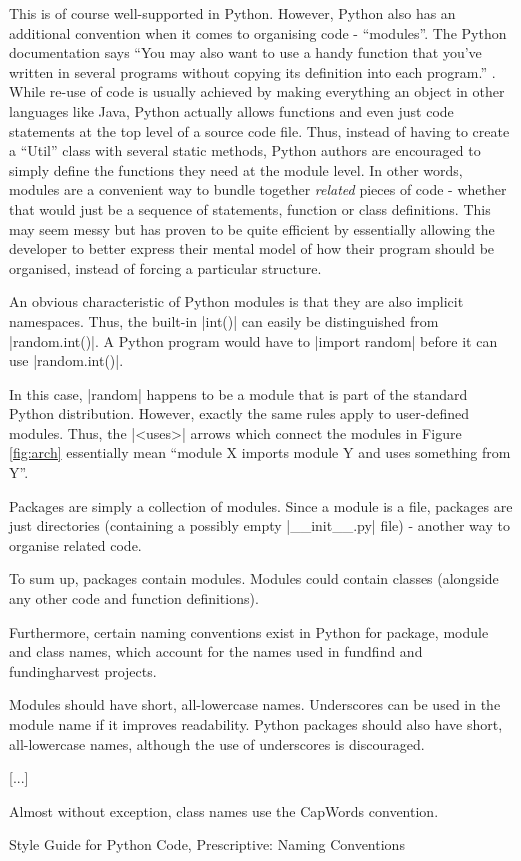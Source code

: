 This is of course well-supported in Python. However, Python also has an additional convention when it comes to organising code - ``modules''. The Python documentation says ``You may also want to use a handy function that you’ve written in several programs without copying its definition into each program.'' \cite{python-doc-modules}. While re-use of code is usually achieved by making everything an object in other languages like Java, Python actually allows functions and even just code statements at the top level of a source code file. Thus, instead of having to create a ``Util'' class with several static methods, Python authors are encouraged to simply define the functions they need at the module level. In other words, modules are a convenient way to bundle together \emph{related} pieces of code - whether that would just be a sequence of statements, function or class definitions. This may seem messy but has proven to be quite efficient by essentially allowing the developer to better express their mental model 
of how their program should be organised, instead of forcing a particular structure.

An obvious characteristic of Python modules is that they are also implicit namespaces. Thus, the built-in |int()| can easily be distinguished from |random.int()|. A Python program would have to |import random| before it can use |random.int()|.

In this case, |random| happens to be a module that is part of the standard Python distribution. However, exactly the same rules apply to user-defined modules. Thus, the |<uses>| arrows which connect the modules in Figure \ref{fig:arch} essentially mean ``module X imports module Y and uses something from Y''.

Packages are simply a collection of modules. Since a module is a file, packages are just directories (containing a possibly empty |__init__.py| file) - another way to organise related code.

To sum up, packages contain modules. Modules could contain classes (alongside any other code and function definitions).

Furthermore, certain naming conventions exist in Python for package, module and class names, which account for the names used in fundfind and fundingharvest projects.

\begin{shadequote}
Modules should have short, all-lowercase names. Underscores can be used in the module name if it improves readability. Python packages should also have short, all-lowercase names, although the use of underscores is discouraged.

[...]

Almost without exception, class names use the CapWords convention.

Style Guide for Python Code, Prescriptive: Naming Conventions \cite{pep8}
\end{shadequote}


